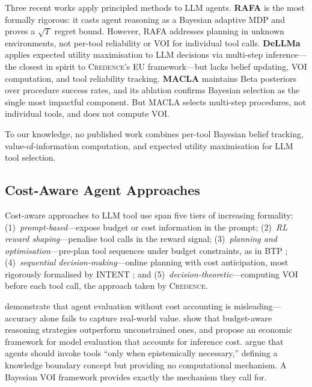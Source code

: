 \documentclass[11pt]{article}
\newcommand{\credence}{\textsc{Credence}}
\begin{document}
Three recent works apply principled methods to LLM agents. \textbf{RAFA} \citep{liu2024rafa} is the most formally rigorous: it casts agent reasoning as a Bayesian adaptive MDP and proves a $\sqrt{T}$ regret bound. However, RAFA addresses planning in unknown environments, not per-tool reliability or VOI for individual tool calls. \textbf{DeLLMa} \citep{liu2025dellma} applies expected utility maximisation to LLM decisions via multi-step inference---the closest in spirit to \credence{}'s EU framework---but lacks belief updating, VOI computation, and tool reliability tracking. \textbf{MACLA} \citep{forouzandeh2026macla} maintains Beta posteriors over procedure success rates, and its ablation confirms Bayesian selection as the single most impactful component. But MACLA selects multi-step procedures, not individual tools, and does not compute VOI.

To our knowledge, no published work combines per-tool Bayesian belief tracking, value-of-information computation, and expected utility maximisation for LLM tool selection.

\subsection{Cost-Aware Agent Approaches}

Cost-aware approaches to LLM tool use span five tiers of increasing formality: (1)~\emph{prompt-based}---expose budget or cost information in the prompt; (2)~\emph{RL reward shaping}---penalise tool calls in the reward signal; (3)~\emph{planning and optimisation}---pre-plan tool sequences under budget constraints, as in BTP \citep{zheng2024btp}; (4)~\emph{sequential decision-making}---online planning with cost anticipation, most rigorously formalised by INTENT \citep{liu2026intent}; and (5)~\emph{decision-theoretic}---computing VOI before each tool call, the approach taken by \credence{}.

\citet{kapoor2025agents} demonstrate that agent evaluation without cost accounting is misleading---accuracy alone fails to capture real-world value. \citet{wang2024tokeneconomies} show that budget-aware reasoning strategies outperform unconstrained ones, and \citet{erol2025costofpass} propose an economic framework for model evaluation that accounts for inference cost. \citet{wang2025epistemic} argue that agents should invoke tools ``only when epistemically necessary,'' defining a knowledge boundary concept but providing no computational mechanism. A Bayesian VOI framework provides exactly the mechanism they call for.
\end{document}
